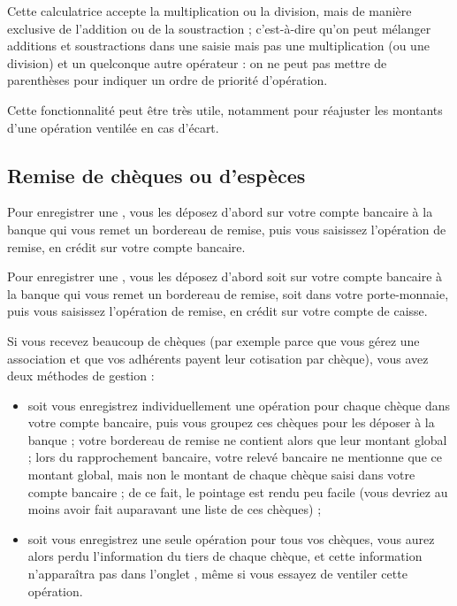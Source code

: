 Cette calculatrice accepte la multiplication ou la division, mais de manière exclusive de l'addition ou de la soustraction ; c'est-à-dire qu'on peut mélanger additions et soustractions dans une saisie mais pas une multiplication (ou une division) et un quelconque autre opérateur : on ne peut pas mettre de parenthèses pour indiquer un ordre de priorité d'opération.

Cette fonctionnalité peut être très utile, notamment pour réajuster les montants d'une opération ventilée en cas d'écart. 


\subsection{Remise de chèques ou d'espèces\label{transactions-new-cheque}}

Pour enregistrer une , vous les déposez d'abord sur votre compte bancaire à la banque qui vous remet un bordereau de remise, puis vous saisissez l'opération de remise, en crédit sur votre compte bancaire.

Pour enregistrer une , vous les déposez d'abord soit sur votre compte bancaire à la banque qui vous remet un bordereau de remise, soit dans votre porte-monnaie, puis vous saisissez l'opération de remise, en crédit sur votre compte de caisse.  

Si vous recevez beaucoup de chèques (par exemple parce que vous gérez une association et que vos adhérents payent leur cotisation par chèque), vous avez deux méthodes de gestion :

\begin{itemize}
	\item soit  vous enregistrez individuellement une opération pour chaque chèque dans votre compte bancaire, puis vous groupez ces chèques pour les déposer à la banque ; votre bordereau de remise ne contient alors que leur montant global ; lors du rapprochement bancaire, votre relevé bancaire ne mentionne que ce montant global, mais non le montant de chaque chèque saisi dans votre compte bancaire ; de ce fait, le pointage est rendu peu facile (vous devriez au moins avoir fait auparavant une liste de ces chèques) ;
	\item soit vous enregistrez une seule opération pour tous vos chèques, vous aurez alors perdu l'information du tiers de chaque chèque, et cette information n'apparaîtra pas dans l'onglet , même si vous essayez de ventiler cette opération.
\end{itemize} 

